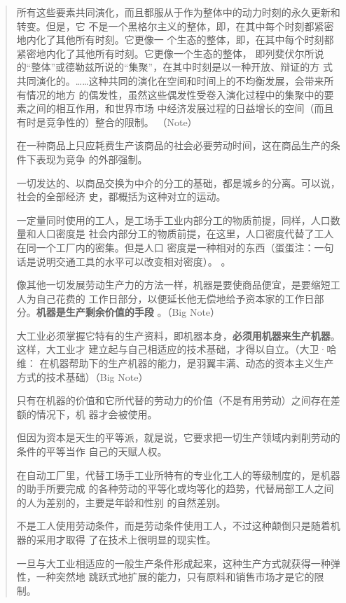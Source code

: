 \begin{quotation}
所有这些要素共同演化，而且都服从于作为整体中的动力时刻的永久更新和转变。但是，它
不是一个黑格尔主义的整体，即，在其中每个时刻都紧密地内化了其他所有时刻。它更像一
个生态的整体，即，在其中每个时刻都紧密地内化了其他所有时刻。它更像一个生态的整体，
即列斐伏尔所说的“整体”或德勒兹所说的“集聚”，在其中时刻是以一种开放、辩证的方
式共同演化的。……这种共同的演化在空间和时间上的不均衡发展，会带来所有情况的地方
的偶发性，虽然这些偶发性受卷入演化过程中的集聚中的要素之间的相互作用，和世界市场
中经济发展过程的日益增长的空间（而且有时是竞争性的）整合的限制。 （Note）


在一种商品上只应耗费生产该商品的社会必要劳动时间，这在商品生产的条件下表现为竞争
的外部强制。

一切发达的、以商品交换为中介的分工的基础，都是城乡的分离。可以说，社会的全部经济
史，都概括为这种对立的运动。

一定量同时使用的工人，是工场手工业内部分工的物质前提，同样，人口数量和人口密度是
社会内部分工的物质前提，在这里，人口密度代替了工人在同一个工厂内的密集。但是人口
密度是一种相对的东西（蛋蛋注：一句话是说明交通工具的水平可以改变相对密度）。
。

像其他一切发展劳动生产力的方法一样，机器是要使商品便宜，是要缩短工人为自己花费的
工作日部分，以便延长他无偿地给予资本家的工作日部分。\textbf{机器是生产剩余价值的手段}
。（Big Note）

大工业必须掌握它特有的生产资料，即机器本身，\textbf{必须用机器来生产机器}。这样，大工业才
建立起与自己相适应的技术基础，才得以自立。（大卫·哈维：
在机器帮助下的生产机器的能力，是羽翼丰满、动态的资本主义生产方式的技术基础）（Big Note）


只有在机器的价值和它所代替的劳动力的价值（不是有用劳动）之间存在差额的情况下，机
器才会被使用。

但因为资本是天生的平等派，就是说，它要求把一切生产领域内剥削劳动的条件的平等当作
自己的天赋人权。

在自动工厂里，代替工场手工业所特有的专业化工人的等级制度的，是机器的助手所要完成
的各种劳动的平等化或均等化的趋势，代替局部工人之间的人为差别的，主要是年龄和性别
的自然差别。

不是工人使用劳动条件，而是劳动条件使用工人，不过这种颠倒只是随着机器的采用才取得
了在技术上很明显的现实性。

一旦与大工业相适应的一般生产条件形成起来，这种生产方式就获得一种弹性，一种突然地
跳跃式地扩展的能力，只有原料和销售市场才是它的限制。


\end{quotation}

